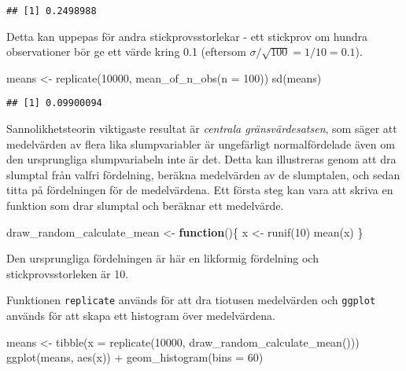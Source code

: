 \documentclass[
]{book}
\newenvironment{Shaded}{\begin{snugshade}}{\end{snugshade}}
\newcommand{\AttributeTok}[1]{\textcolor[rgb]{0.77,0.63,0.00}{#1}}
\newcommand{\ControlFlowTok}[1]{\textcolor[rgb]{0.13,0.29,0.53}{\textbf{#1}}}
\newcommand{\DecValTok}[1]{\textcolor[rgb]{0.00,0.00,0.81}{#1}}
\newcommand{\FunctionTok}[1]{\textcolor[rgb]{0.00,0.00,0.00}{#1}}
\newcommand{\NormalTok}[1]{#1}
\newcommand{\OtherTok}[1]{\textcolor[rgb]{0.56,0.35,0.01}{#1}}
\newcommand{\SpecialCharTok}[1]{\textcolor[rgb]{0.00,0.00,0.00}{#1}}
\theoremstyle{definition}
\theoremstyle{definition}
\theoremstyle{definition}
\theoremstyle{definition}
\theoremstyle{remark}
\begin{document}
\begin{verbatim}
## [1] 0.2498988
\end{verbatim}

Detta kan uppepas för andra stickprovsstorlekar - ett stickprov om hundra observationer bör ge ett värde kring 0.1 (eftersom \(\sigma / \sqrt{100} = 1 / 10 = 0.1\)).

\begin{Shaded}
\begin{Highlighting}[]
\NormalTok{means }\OtherTok{\textless{}{-}} \FunctionTok{replicate}\NormalTok{(}\DecValTok{10000}\NormalTok{, }\FunctionTok{mean\_of\_n\_obs}\NormalTok{(}\AttributeTok{n =} \DecValTok{100}\NormalTok{))}
\FunctionTok{sd}\NormalTok{(means)}
\end{Highlighting}
\end{Shaded}

\begin{verbatim}
## [1] 0.09900094
\end{verbatim}

Sannolikhetsteorin viktigaste resultat är \emph{centrala gränsvärdesatsen}, som säger att medelvärden av flera lika slumpvariabler är ungefärligt normalfördelade även om den ursprungliga slumpvariabeln inte är det. Detta kan illustreras genom att dra slumptal från valfri fördelning, beräkna medelvärden av de slumptalen, och sedan titta på fördelningen för de medelvärdena. Ett första steg kan vara att skriva en funktion som drar slumptal och beräknar ett medelvärde.

\begin{Shaded}
\begin{Highlighting}[]
\NormalTok{draw\_random\_calculate\_mean }\OtherTok{\textless{}{-}} \ControlFlowTok{function}\NormalTok{()\{}
\NormalTok{  x }\OtherTok{\textless{}{-}} \FunctionTok{runif}\NormalTok{(}\DecValTok{10}\NormalTok{)}
  \FunctionTok{mean}\NormalTok{(x)}
\NormalTok{\}}
\end{Highlighting}
\end{Shaded}

Den ursprungliga fördelningen är här en likformig fördelning och stickprovsstorleken är 10.

Funktionen \texttt{replicate} används för att dra tiotusen medelvärden och \texttt{ggplot} används för att skapa ett histogram över medelvärdena.

\begin{Shaded}
\begin{Highlighting}[]
\NormalTok{means }\OtherTok{\textless{}{-}} \FunctionTok{tibble}\NormalTok{(}\AttributeTok{x =} \FunctionTok{replicate}\NormalTok{(}\DecValTok{10000}\NormalTok{, }\FunctionTok{draw\_random\_calculate\_mean}\NormalTok{()))}
\FunctionTok{ggplot}\NormalTok{(means, }\FunctionTok{aes}\NormalTok{(x)) }\SpecialCharTok{+}
  \FunctionTok{geom\_histogram}\NormalTok{(}\AttributeTok{bins =} \DecValTok{60}\NormalTok{)}
\end{Highlighting}
\end{Shaded}
\end{document}
